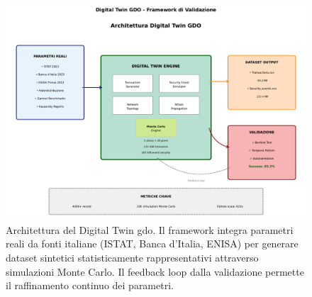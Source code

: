 \begin{figure}[H]
\centering
\includegraphics[width=\textwidth]{thesis_figures/cap2/digital_twin_architecture.pdf}
\caption{Architettura del Digital Twin \gls{gdo}. Il framework integra parametri 
reali da fonti italiane (ISTAT, Banca d'Italia, ENISA) per generare dataset 
sintetici statisticamente rappresentativi attraverso simulazioni Monte Carlo. 
Il feedback loop dalla validazione permette il raffinamento continuo dei parametri.}
\label{fig:digital_twin_architecture}
\end{figure}

